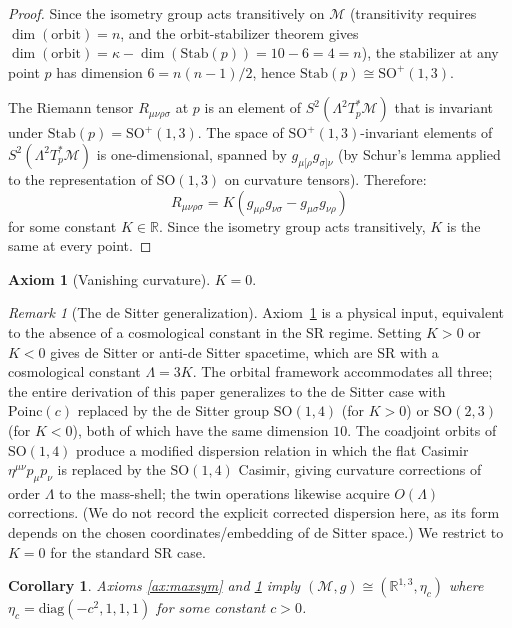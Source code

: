 \documentclass[12pt]{article}
\theoremstyle{plain}
\newtheorem{corollary}[theorem]{Corollary}
\theoremstyle{definition}
\newtheorem{axiom}[theorem]{Axiom}
\theoremstyle{remark}
\newtheorem{remark}[theorem]{Remark}
\newcommand{\R}{\mathbb{R}}
\newcommand{\Poinc}{\mathrm{Poinc}}
\newcommand{\Stab}{\mathrm{Stab}}
\newcommand{\SO}{\mathrm{SO}}
\begin{document}
\begin{proof}
Since the isometry group acts transitively on $\mathcal{M}$ (transitivity requires $\dim(\mathrm{orbit}) = n$, and the orbit-stabilizer theorem gives $\dim(\mathrm{orbit}) = \kappa - \dim(\Stab(p)) = 10 - 6 = 4 = n$), the stabilizer at any point $p$ has dimension $6 = n(n-1)/2$, hence $\Stab(p) \cong \SO^+(1,3)$.

The Riemann tensor $R_{\mu\nu\rho\sigma}$ at $p$ is an element of $S^2(\Lambda^2 T_p^*\mathcal{M})$ that is invariant under $\Stab(p) = \SO^+(1,3)$. The space of $\SO^+(1,3)$-invariant elements of $S^2(\Lambda^2 T_p^*\mathcal{M})$ is one-dimensional, spanned by $g_{\mu[\rho}g_{\sigma]\nu}$ (by Schur's lemma applied to the representation of $\SO(1,3)$ on curvature tensors). Therefore:
\begin{equation}\label{eq:constcurv}
R_{\mu\nu\rho\sigma} = K(g_{\mu\rho}g_{\nu\sigma} - g_{\mu\sigma}g_{\nu\rho})
\end{equation}
for some constant $K \in \R$. Since the isometry group acts transitively, $K$ is the same at every point.
\end{proof}

\begin{axiom}[Vanishing curvature]\label{ax:flat}
$K = 0$.
\end{axiom}

\begin{remark}[The de Sitter generalization]\label{rmk:desitter}
Axiom~\ref{ax:flat} is a physical input, equivalent to the absence of a cosmological constant in the SR regime. Setting $K > 0$ or $K < 0$ gives de Sitter or anti-de Sitter spacetime, which are SR with a cosmological constant $\Lambda = 3K$. The orbital framework accommodates all three; the entire derivation of this paper generalizes to the de Sitter case with $\Poinc(c)$ replaced by the de Sitter group $\SO(1,4)$ (for $K > 0$) or $\SO(2,3)$ (for $K < 0$), both of which have the same dimension $10$. The coadjoint orbits of $\SO(1,4)$ produce a modified dispersion relation in which the flat Casimir $\eta^{\mu\nu}p_\mu p_\nu$ is replaced by the $\SO(1,4)$ Casimir, giving curvature corrections of order $\Lambda$ to the mass-shell; the twin operations likewise acquire $O(\Lambda)$ corrections. (We do not record the explicit corrected dispersion here, as its form depends on the chosen coordinates/embedding of de Sitter space.) We restrict to $K = 0$ for the standard SR case.
\end{remark}

\begin{corollary}\label{cor:minkowski}
Axioms \ref{ax:maxsym} and \ref{ax:flat} imply $(\mathcal{M}, g) \cong (\R^{1,3}, \eta_c)$ where $\eta_c = \mathrm{diag}(-c^2, 1, 1, 1)$ for some constant $c > 0$.
\end{corollary}
\end{document}
